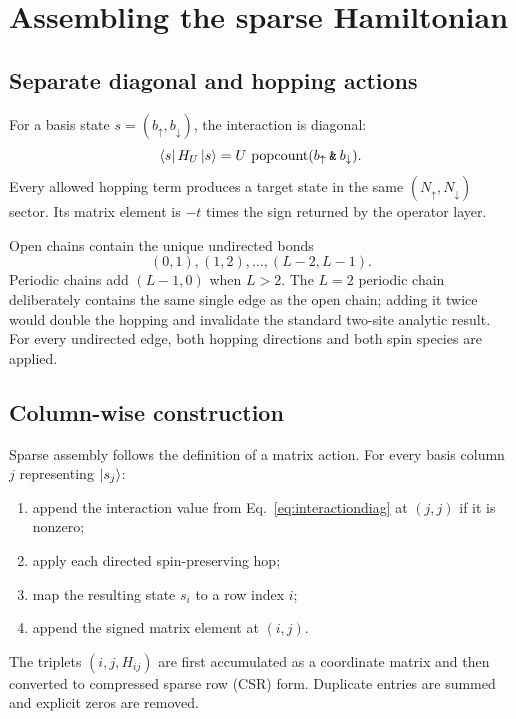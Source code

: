 \chapter{Assembling the sparse Hamiltonian}
\label{chap:sparse}

\section{Separate diagonal and hopping actions}

For a basis state $s=(b_\uparrow,b_\downarrow)$, the interaction is diagonal:
\begin{equation}
\left\langle s \right\rvert H_U\left\lvert s \right\rangle=U\,
\operatorname{popcount}(b_\uparrow\mathbin{\texttt{\&}}b_\downarrow).
\label{eq:interactiondiag}
\end{equation}
Every allowed hopping term produces a target state in the same
$(N_\uparrow,N_\downarrow)$ sector.  Its matrix element is $-t$ times the sign
returned by the operator layer.

Open chains contain the unique undirected bonds
\begin{equation}
(0,1),(1,2),\ldots,(L-2,L-1).
\end{equation}
Periodic chains add $(L-1,0)$ when $L>2$.  The $L=2$ periodic chain deliberately
contains the same single edge as the open chain; adding it twice would double
the hopping and invalidate the standard two-site analytic result.  For every
undirected edge, both hopping directions and both spin species are applied.

\section{Column-wise construction}

Sparse assembly follows the definition of a matrix action.  For every basis
column $j$ representing $\left\lvert s_j \right\rangle$:
\begin{enumerate}
\item append the interaction value from Eq.~\eqref{eq:interactiondiag} at
      $(j,j)$ if it is nonzero;
\item apply each directed spin-preserving hop;
\item map the resulting state $s_i$ to a row index $i$;
\item append the signed matrix element at $(i,j)$.
\end{enumerate}
The triplets $(i,j,H_{ij})$ are first accumulated as a coordinate matrix and
then converted to compressed sparse row (CSR) form.  Duplicate entries are
summed and explicit zeros are removed.

